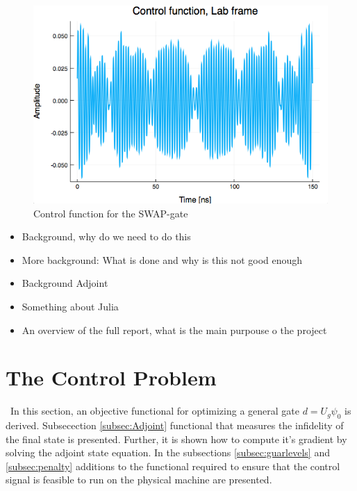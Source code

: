 \documentclass[11pt]{article}
\begin{document}
\begin{figure}
  \includegraphics[width=\linewidth]{controlfunc}
  \caption{Control function for the SWAP-gate}
  \label{fig:controlfunc}
\end{figure}

\begin{itemize}
  \item Background, why do we need to do this 
  \item More background: What is done and why is this not good enough
  \item Background Adjoint
  \item Something about Julia
  \item An overview of the full report, what is the main purpouse o the project
\end{itemize}

%
%
%
%
\section{The Control Problem} \
In this section, an objective functional for optimizing a general gate $d = U_g \psi_0$ is derived. Subsecection \ref{subsec:Adjoint}  functional that measures the infidelity of the final state is presented. Further, it is shown how to compute it's gradient by solving the adjoint state equation. In the subsections \ref{subsec:guarlevels} and \ref{subsec:penalty} additions to the functional required to ensure that the control signal is feasible to run on the physical machine are presented.
\end{document}
